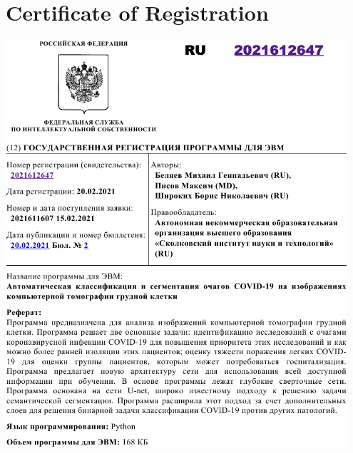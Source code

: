%
%
%
%


\chapter{Certificate of Registration}
\label{app:reg}

\begin{center}
	\includegraphics[width=0.95\textwidth]{Dissertation/Figures/6_appendix/output_crop.pdf}
\end{center}

